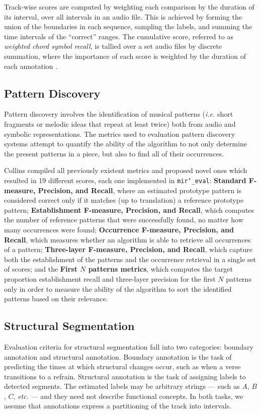\documentclass{article}
\def\ie{\emph{i.e.}}
\def\etc{\emph{etc.}}
\def\mireval{\texttt{mir\char`_eval}}
\begin{document}
Track-wise scores are computed by weighting each comparison by the duration of its interval, over all intervals in an audio file.
This is achieved by forming the union of the boundaries in each sequence, sampling the labels, and summing the time intervals of the ``correct'' ranges. 
The cumulative score, referred to as \emph{weighted chord symbol recall}, is tallied over a set audio files by discrete summation, where the importance of each score is weighted by the duration of each annotation \cite{choi2013mirex}.
 
\subsection{Pattern Discovery}

Pattern discovery involves the identification of musical patterns (\ie{} short fragments or melodic ideas that repeat at least twice) both from audio and symbolic representations.
The metrics used to evaluation pattern discovery systems attempt to quantify the ability of the algorithm to not only determine the present patterns in a piece, but also to find all of their occurrences.

Collins compiled all previously existent metrics and proposed novel ones \cite{Collins2013} which resulted in 19 different scores, each one implemented in \mireval{}:
\textbf{Standard F-measure, Precision, and Recall}, where an estimated prototype pattern is considered correct only if it matches (up to translation) a reference prototype pattern;
\textbf{Establishment F-measure, Precision, and Recall}, which computes the number of reference patterns that were successfully found, no matter how many occurrences were found;
\textbf{Occurrence F-measure, Precision, and Recall}, which measures whether an algorithm is able to retrieve all occurrences of a pattern;
\textbf{Three-layer F-measure, Precision, and Recall}, which capture both the establishment of the patterns and the occurrence retrieval in a single set of scores;
and the \textbf{First $N$ patterns metrics}, which computes the target proportion establishment recall and three-layer precision for the first $N$ patterns only in order to measure the ability of the algorithm to sort the identified patterns based on their relevance. 

\subsection{Structural Segmentation}

Evaluation criteria for structural segmentation fall into two categories: boundary annotation and structural annotation.
Boundary annotation is the task of predicting the times at which structural changes occur, such as when a verse transitions to a refrain.
Structural annotation is the task of assigning labels to detected segments.
The estimated labels may be arbitrary strings --- such as $A$, $B$, $C$, \etc{} --- and they need not describe functional concepts.
In both tasks, we assume that annotations express a partitioning of the track into intervals.
\end{document}
